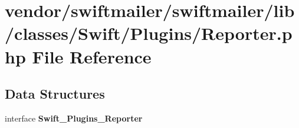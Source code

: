 \section{vendor/swiftmailer/swiftmailer/lib/classes/\+Swift/\+Plugins/\+Reporter.php File Reference}
\label{_reporter_8php}
\subsection*{Data Structures}
\begin{DoxyCompactItemize}
\item 
interface {\bf Swift\+\_\+\+Plugins\+\_\+\+Reporter}
\end{DoxyCompactItemize}
